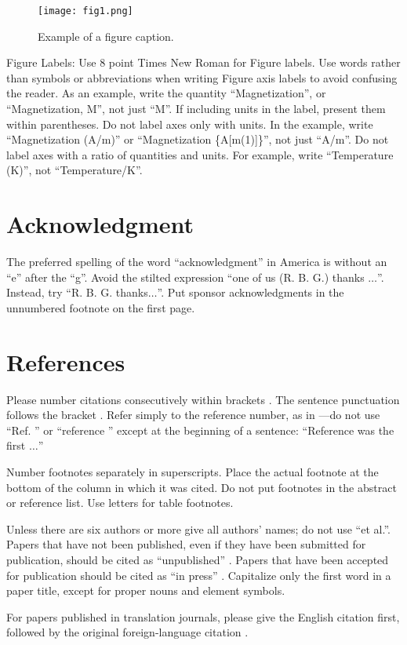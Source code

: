 \documentclass[conference]{IEEEtran}
\begin{document}
\begin{figure}[htbp]
\centerline{\texttt{[image: fig1.png]}}
\caption{Example of a figure caption.}
\label{fig}
\end{figure}

Figure Labels: Use 8 point Times New Roman for Figure labels. Use words 
rather than symbols or abbreviations when writing Figure axis labels to 
avoid confusing the reader. As an example, write the quantity 
``Magnetization'', or ``Magnetization, M'', not just ``M''. If including 
units in the label, present them within parentheses. Do not label axes only 
with units. In the example, write ``Magnetization (A/m)'' or ``Magnetization 
\{A[m(1)]\}'', not just ``A/m''. Do not label axes with a ratio of 
quantities and units. For example, write ``Temperature (K)'', not 
``Temperature/K''.

\section*{Acknowledgment}

The preferred spelling of the word ``acknowledgment'' in America is without 
an ``e'' after the ``g''. Avoid the stilted expression ``one of us (R. B. 
G.) thanks $\ldots$''. Instead, try ``R. B. G. thanks$\ldots$''. Put sponsor 
acknowledgments in the unnumbered footnote on the first page.

\section*{References}

Please number citations consecutively within brackets \cite{b1}. The 
sentence punctuation follows the bracket \cite{b2}. Refer simply to the reference 
number, as in \cite{b3}---do not use ``Ref. \cite{b3}'' or ``reference \cite{b3}'' except at 
the beginning of a sentence: ``Reference \cite{b3} was the first $\ldots$''

Number footnotes separately in superscripts. Place the actual footnote at 
the bottom of the column in which it was cited. Do not put footnotes in the 
abstract or reference list. Use letters for table footnotes.

Unless there are six authors or more give all authors' names; do not use 
``et al.''. Papers that have not been published, even if they have been 
submitted for publication, should be cited as ``unpublished'' \cite{b4}. Papers 
that have been accepted for publication should be cited as ``in press'' \cite{b5}. 
Capitalize only the first word in a paper title, except for proper nouns and 
element symbols.

For papers published in translation journals, please give the English 
citation first, followed by the original foreign-language citation \cite{b6}.


\end{document}
